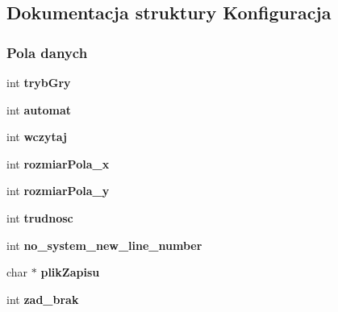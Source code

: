 \hypertarget{structKonfiguracja}{}\subsection{Dokumentacja struktury Konfiguracja}
\label{structKonfiguracja}
\subsubsection*{Pola danych}
\begin{DoxyCompactItemize}
\item 
\mbox{\label{structKonfiguracja_a6d6a12fed0a499a2356876b4429e3f29}} 
int {\bfseries tryb\+Gry}
\item 
\mbox{\label{structKonfiguracja_a4f20efcf0d46fea001a26ce820a50ebc}} 
int {\bfseries automat}
\item 
\mbox{\label{structKonfiguracja_a6c7faed433d10e58848fd984dda4a561}} 
int {\bfseries wczytaj}
\item 
\mbox{\label{structKonfiguracja_a407bed0ab67c581f4f1ecdedc201001f}} 
int {\bfseries rozmiar\+Pola\+\_\+x}
\item 
\mbox{\label{structKonfiguracja_accf54703c549a589551fd25e9d27b4ea}} 
int {\bfseries rozmiar\+Pola\+\_\+y}
\item 
\mbox{\label{structKonfiguracja_ac38ed980a6513349cd126caf4641a944}} 
int {\bfseries trudnosc}
\item 
\mbox{\label{structKonfiguracja_a428dc410ff0bc86a8c0d1356116a9ee5}} 
int {\bfseries no\+\_\+system\+\_\+new\+\_\+line\+\_\+number}
\item 
\mbox{\label{structKonfiguracja_af5057fc5cd871fa8ef6cb776dcad6551}} 
char $\ast$ {\bfseries plik\+Zapisu}
\item 
\mbox{\label{structKonfiguracja_ab9a7d3a8b3ca7df998e083d88ab90440}} 
int {\bfseries zad\+\_\+brak}
\item 
\mbox{\label{structKonfiguracja_a60d4d9ba5c20bcb58096592692b1769e}} 

\end{DoxyCompactItemize}
